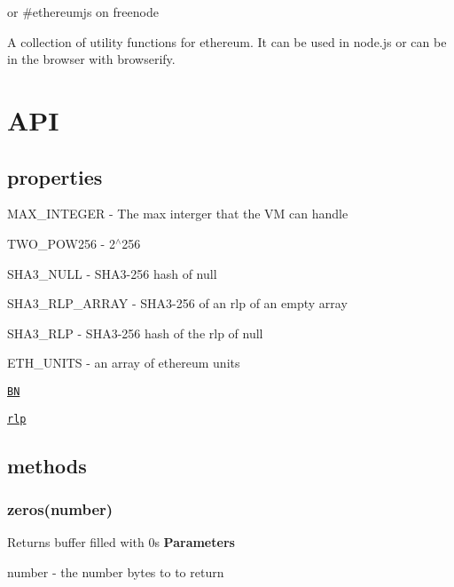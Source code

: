\href{https://github.com/feross/standard}{\tt } \href{https://travis-ci.org/ethereum/ethereumjs-util}{\tt } \href{https://gitter.im/ethereum/ethereumjs-lib?utm_source=badge&utm_medium=badge&utm_campaign=pr-badge}{\tt } or \#ethereumjs on freenode

A collection of utility functions for ethereum. It can be used in node.\+js or can be in the browser with browserify.

\section*{A\+PI}

\subsection*{properties}


\begin{DoxyItemize}
\item {\ttfamily M\+A\+X\+\_\+\+I\+N\+T\+E\+G\+ER} -\/ The max interger that the VM can handle
\item {\ttfamily T\+W\+O\+\_\+\+P\+O\+W256} -\/ 2$^\wedge$256
\item {\ttfamily S\+H\+A3\+\_\+\+N\+U\+LL} -\/ S\+H\+A3-\/256 hash of {\ttfamily null}
\item {\ttfamily S\+H\+A3\+\_\+\+R\+L\+P\+\_\+\+A\+R\+R\+AY} -\/ S\+H\+A3-\/256 of an rlp of an empty array
\item {\ttfamily S\+H\+A3\+\_\+\+R\+LP} -\/ S\+H\+A3-\/256 hash of the rlp of {\ttfamily null}
\item {\ttfamily E\+T\+H\+\_\+\+U\+N\+I\+TS} -\/ an array of ethereum units
\item \href{https://github.com/indutny/bn.js}{\tt {\ttfamily BN}}
\item \href{https://github.com/wanderer/rlp}{\tt {\ttfamily rlp}}
\end{DoxyItemize}

\subsection*{methods}

\subsubsection*{{\ttfamily zeros(number)}}

Returns buffer filled with 0\textquotesingle{}s {\bfseries Parameters}
\begin{DoxyItemize}
\item {\ttfamily number} -\/ the number bytes to to return
\end{DoxyItemize}

